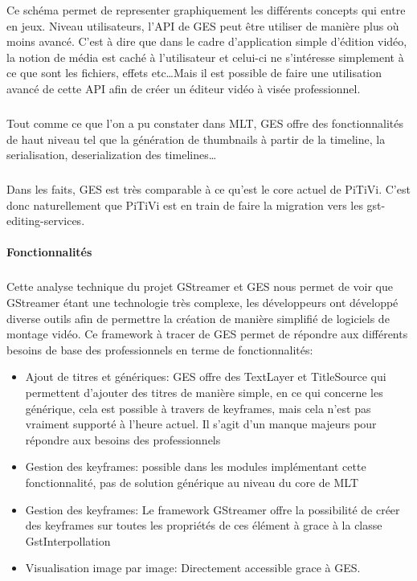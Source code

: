 Ce schéma permet de representer graphiquement les différents concepts
qui entre en jeux. Niveau utilisateurs, l'API de GES peut être
utiliser de manière plus où moins avancé. C'est à dire que dans le
cadre d'application simple d'édition vidéo, la notion de média est
caché à l'utilisateur et celui-ci ne s'intéresse simplement à ce
que sont les fichiers, effets etc\ldots Mais il est possible de faire
une utilisation avancé de cette API afin de créer un éditeur vidéo
à visée professionnel.

\subparagraph{}

Tout comme ce que l'on a pu constater dans MLT, GES offre des
fonctionnalités de haut niveau tel que la génération de thumbnails
à partir de la timeline, la serialisation, deserialization des
timelines\ldots

\subparagraph{}

Dans les faits, GES est très comparable à ce qu'est le core actuel
de PiTiVi. C'est donc naturellement que PiTiVi est en train de faire la
migration vers les gst-editing-services.

\paragraph{Fonctionnalités}

\subparagraph{ }

Cette analyse technique du projet GStreamer et GES nous permet de voir
que GStreamer étant une technologie très complexe, les développeurs
ont développé diverse outils afin de permettre la création de manière
simplifié de logiciels de montage vidéo. Ce framework à tracer de GES
permet de répondre aux différents besoins de base des professionnels
en terme de fonctionnalités:

\begin{itemize}

  \item {Ajout de titres et génériques: GES offre des TextLayer et
  TitleSource
    qui permettent d'ajouter des titres de manière simple, en ce qui
    concerne les générique, cela est possible à travers de keyframes,
    mais cela n'est pas vraiment supporté à l'heure actuel. Il s'agit
    d'un manque majeurs pour répondre aux besoins des professionnels}

  \item {Gestion des keyframes: possible dans les modules implémentant
    cette fonctionnalité, pas de solution générique au niveau du core
    de MLT}

  \item {Gestion des keyframes: Le framework GStreamer offre la
  possibilité
    de créer des keyframes sur toutes les propriétés de ces élément
    à grace à la classe GstInterpollation}

  \item {Visualisation image par image: Directement accessible grace
  à GES.}

\end{itemize}

